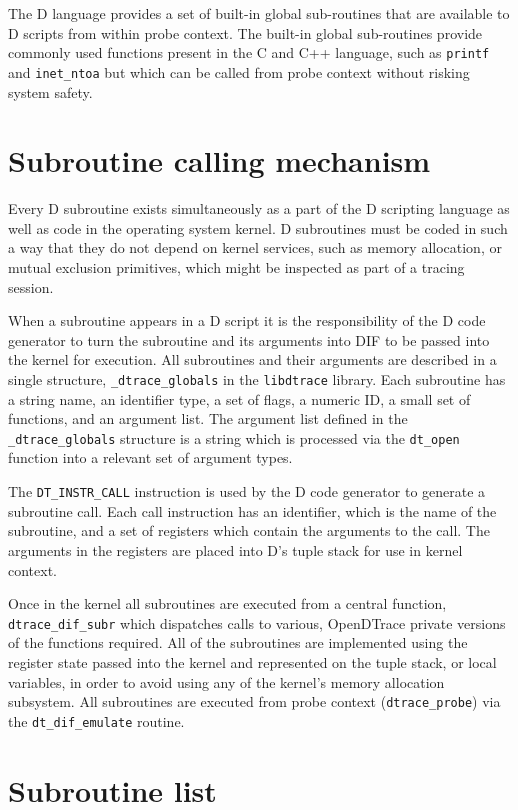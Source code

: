 The D language provides a set of built-in global sub-routines that are
available to D scripts from within probe context.  The built-in global
sub-routines provide commonly used functions present in the C and C++
language, such as \verb|printf| and \verb|inet_ntoa| but which can be
called from probe context without risking system safety.

\section{Subroutine calling mechanism}

Every D subroutine exists simultaneously as a part of the D scripting
language as well as code in the operating system kernel.  D subroutines
must be coded in such a way that they do not depend on kernel
services, such as memory allocation, or mutual exclusion primitives,
which might be inspected as part of a tracing session.

When a subroutine appears in a D script it is the responsibility of
the D code generator to turn the subroutine and its arguments into DIF
to be passed into the kernel for execution.  All subroutines and their
arguments are described in a single structure, \verb|_dtrace_globals|
in the \verb|libdtrace| library.  Each subroutine has a string name,
an identifier type, a set of flags, a numeric ID, a small set of
functions, and an argument list.  The argument list defined in the
\verb|_dtrace_globals| structure is a string which is processed via
the \verb|dt_open| function into a relevant set of argument types.

The \verb|DT_INSTR_CALL| instruction is used by the D code generator
to generate a subroutine call.  Each call instruction has an
identifier, which is the name of the subroutine, and a set of
registers which contain the arguments to the call.  The arguments in
the registers are placed into D's tuple stack for use in kernel
context.

Once in the kernel all subroutines are executed from a central
function, \verb|dtrace_dif_subr| which dispatches calls to various,
OpenDTrace private versions of the functions required.  All of the
subroutines are implemented using the register state passed into the
kernel and represented on the tuple stack, or local variables, in
order to avoid using any of the kernel's memory allocation subsystem.
All subroutines are executed from probe context (\verb|dtrace_probe|)
via the \verb|dt_dif_emulate| routine.

\section{Subroutine list}
\label{sec:subroutine-list}

